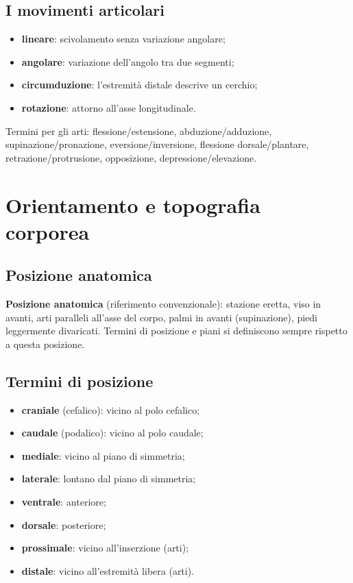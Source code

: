 \subsection{I movimenti articolari}
\begin{itemize}
  \item \textbf{lineare}: scivolamento senza variazione angolare;
  \item \textbf{angolare}: variazione dell'angolo tra due segmenti;
  \item \textbf{circumduzione}: l'estremità distale descrive un cerchio;
  \item \textbf{rotazione}: attorno all'asse longitudinale.
\end{itemize}
Termini per gli arti: flessione/estensione, abduzione/adduzione, supinazione/pronazione,
eversione/inversione, flessione dorsale/plantare, retrazione/protrusione, opposizione,
depressione/elevazione.

\section{Orientamento e topografia corporea}

\subsection{Posizione anatomica}
\textbf{Posizione anatomica} (riferimento convenzionale): stazione eretta, viso in avanti, arti
paralleli all'asse del corpo, palmi in avanti (supinazione), piedi leggermente divaricati. Termini
di posizione e piani si definiscono sempre rispetto a questa posizione.

\subsection{Termini di posizione}
\begin{itemize}
  \item \textbf{craniale} (cefalico): vicino al polo cefalico;
  \item \textbf{caudale} (podalico): vicino al polo caudale;
  \item \textbf{mediale}: vicino al piano di simmetria;
  \item \textbf{laterale}: lontano dal piano di simmetria;
  \item \textbf{ventrale}: anteriore;
  \item \textbf{dorsale}: posteriore;
  \item \textbf{prossimale}: vicino all'inserzione (arti);
  \item \textbf{distale}: vicino all'estremità libera (arti).
\end{itemize}

